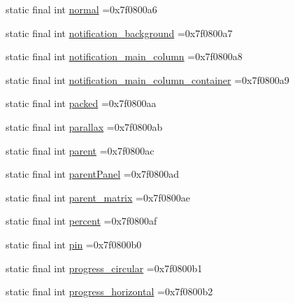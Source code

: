 \begin{DoxyCompactItemize}
static final int \mbox{\hyperlink{classcom_1_1example_1_1trainawearapplication_1_1_r_1_1id_a689b4457ee0063e91c2eac3785fd82fe}{normal}} =0x7f0800a6
\item 
static final int \mbox{\hyperlink{classcom_1_1example_1_1trainawearapplication_1_1_r_1_1id_ae32a2c4e05fb0a85a9988c30cca20fc3}{notification\+\_\+background}} =0x7f0800a7
\item 
static final int \mbox{\hyperlink{classcom_1_1example_1_1trainawearapplication_1_1_r_1_1id_a9d1a59bda0ac210d6f19395bb3b7f096}{notification\+\_\+main\+\_\+column}} =0x7f0800a8
\item 
static final int \mbox{\hyperlink{classcom_1_1example_1_1trainawearapplication_1_1_r_1_1id_a61a17f2a2f8d156212cc77cd4dee23ee}{notification\+\_\+main\+\_\+column\+\_\+container}} =0x7f0800a9
\item 
static final int \mbox{\hyperlink{classcom_1_1example_1_1trainawearapplication_1_1_r_1_1id_a163dd0e82d432ae754774215c44a2eed}{packed}} =0x7f0800aa
\item 
static final int \mbox{\hyperlink{classcom_1_1example_1_1trainawearapplication_1_1_r_1_1id_a82c5740b80947fbea59d18192f56de7a}{parallax}} =0x7f0800ab
\item 
static final int \mbox{\hyperlink{classcom_1_1example_1_1trainawearapplication_1_1_r_1_1id_a421d3312bb32cd36ad2e7abdd3e62700}{parent}} =0x7f0800ac
\item 
static final int \mbox{\hyperlink{classcom_1_1example_1_1trainawearapplication_1_1_r_1_1id_a12e2c4e7ebf72f28fd73722e59d1e01e}{parent\+Panel}} =0x7f0800ad
\item 
static final int \mbox{\hyperlink{classcom_1_1example_1_1trainawearapplication_1_1_r_1_1id_a335b7b2456cbf4329c850d8d92aae061}{parent\+\_\+matrix}} =0x7f0800ae
\item 
static final int \mbox{\hyperlink{classcom_1_1example_1_1trainawearapplication_1_1_r_1_1id_ab3eefef7ec029c22b80fdbf8ebb134ff}{percent}} =0x7f0800af
\item 
static final int \mbox{\hyperlink{classcom_1_1example_1_1trainawearapplication_1_1_r_1_1id_abec0e674cf2ec849645147c2c573aade}{pin}} =0x7f0800b0
\item 
static final int \mbox{\hyperlink{classcom_1_1example_1_1trainawearapplication_1_1_r_1_1id_a086345a2f50e9c945083f7196396f225}{progress\+\_\+circular}} =0x7f0800b1
\item 
static final int \mbox{\hyperlink{classcom_1_1example_1_1trainawearapplication_1_1_r_1_1id_a6129f9516a633c0e9b4a25ae2a3b2681}{progress\+\_\+horizontal}} =0x7f0800b2

\end{DoxyCompactItemize}
